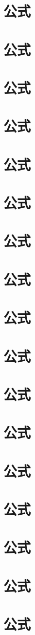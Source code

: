 \chapter{公式}
\chapter{公式}
\chapter{公式}
\chapter{公式}
\chapter{公式}
\chapter{公式}
\chapter{公式}
\chapter{公式}
\chapter{公式}
\chapter{公式}
\chapter{公式}
\chapter{公式}
\chapter{公式}
\chapter{公式}
\chapter{公式}
\chapter{公式}
\chapter{公式}

